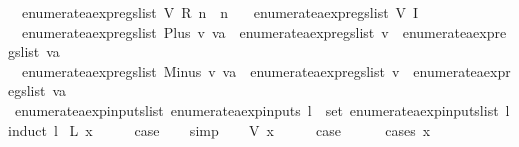 \begin{isabellebody}
\ \ {\isachardoublequoteopen}enumerate{\isacharunderscore}aexp{\isacharunderscore}regs{\isacharunderscore}list\ {\isacharparenleft}V\ {\isacharparenleft}R\ n{\isacharparenright}{\isacharparenright}\ {\isacharequal}\ {\isacharbrackleft}n{\isacharbrackright}{\isachardoublequoteclose}\ {\isacharbar}\isanewline
\ \ {\isachardoublequoteopen}enumerate{\isacharunderscore}aexp{\isacharunderscore}regs{\isacharunderscore}list\ {\isacharparenleft}V\ {\isacharparenleft}I\ {\isacharunderscore}{\isacharparenright}{\isacharparenright}\ {\isacharequal}\ {\isacharbrackleft}{\isacharbrackright}{\isachardoublequoteclose}\ {\isacharbar}\isanewline
\ \ {\isachardoublequoteopen}enumerate{\isacharunderscore}aexp{\isacharunderscore}regs{\isacharunderscore}list\ {\isacharparenleft}Plus\ v\ va{\isacharparenright}\ {\isacharequal}\ enumerate{\isacharunderscore}aexp{\isacharunderscore}regs{\isacharunderscore}list\ v\ {\isacharat}\ enumerate{\isacharunderscore}aexp{\isacharunderscore}regs{\isacharunderscore}list\ va{\isachardoublequoteclose}\ {\isacharbar}\isanewline
\ \ {\isachardoublequoteopen}enumerate{\isacharunderscore}aexp{\isacharunderscore}regs{\isacharunderscore}list\ {\isacharparenleft}Minus\ v\ va{\isacharparenright}\ {\isacharequal}\ enumerate{\isacharunderscore}aexp{\isacharunderscore}regs{\isacharunderscore}list\ v\ {\isacharat}\ enumerate{\isacharunderscore}aexp{\isacharunderscore}regs{\isacharunderscore}list\ va{\isachardoublequoteclose}\isanewline
\isanewline
{}\isamarkupfalse%
\ enumerate{\isacharunderscore}aexp{\isacharunderscore}inputs{\isacharunderscore}list{\isacharcolon}\ {\isachardoublequoteopen}enumerate{\isacharunderscore}aexp{\isacharunderscore}inputs\ l\ {\isacharequal}\ set\ {\isacharparenleft}enumerate{\isacharunderscore}aexp{\isacharunderscore}inputs{\isacharunderscore}list\ l{\isacharparenright}{\isachardoublequoteclose}\isanewline
%
\isadelimproof
%
\endisadelimproof
%
\isatagproof
{}\isamarkupfalse%
{\isacharparenleft}induct\ l{\isacharparenright}\isanewline
{}\isamarkupfalse%
\ {\isacharparenleft}L\ x{\isacharparenright}\isanewline
\ \ \isamarkupfalse%
\ \isamarkupfalse%
\ {\isacharquery}case\isanewline
\ \ \isamarkupfalse%
\ simp\isanewline
{}\isamarkupfalse%
\isanewline
\ \ \isamarkupfalse%
\ {\isacharparenleft}V\ x{\isacharparenright}\isanewline
\ \ \isamarkupfalse%
\ \isamarkupfalse%
\ {\isacharquery}case\isanewline
\ \ \ \ \isamarkupfalse%
\ {\isacharparenleft}cases\ x{\isacharparenright}\isanewline

\end{isabellebody}
